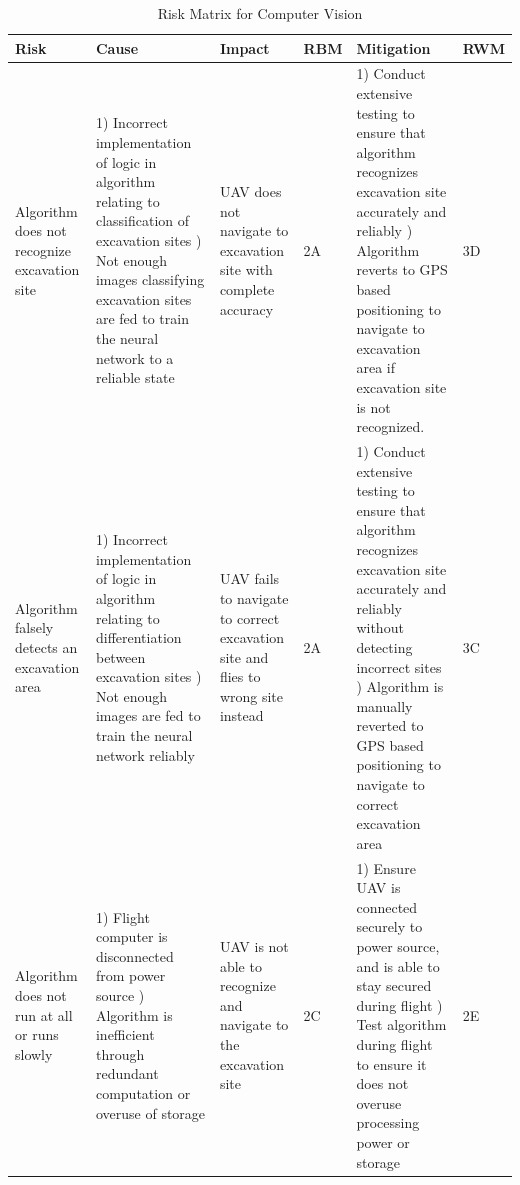  \begin{table}[]
                \label{computer vision}
                {\footnotesize
                \caption{Risk Matrix for Computer Vision}
                \centering
                \begin{tabularx}{\linewidth}{XXXlXl}
                \toprule
                \textbf{Risk}                                            & \textbf{Cause}                                                                                                                 & \textbf{Impact}                                                                                                                           & \textbf{RBM}  & \textbf{Mitigation}                                                                                                                                                                                     & \textbf{RWM} \\
                \midrule
                Algorithm does not recognize excavation site & 1) Incorrect implementation of logic in algorithm relating to classification of excavation sites \newline 2) Not enough images classifying excavation sites are fed to train the neural network to a reliable state & UAV does not navigate to excavation site with complete accuracy & \cellcolor{red!25} 2A & 1) Conduct extensive testing to ensure that algorithm recognizes excavation site accurately and reliably \newline 2) Algorithm reverts to GPS based positioning to navigate to excavation area if excavation site is not recognized. & \cellcolor{green!25} 3D \\
                Algorithm falsely detects an excavation area & 1) Incorrect implementation of logic in algorithm relating to differentiation between excavation sites \newline 2) Not enough images are fed to train the neural network reliably & UAV fails to navigate to correct excavation site and flies to wrong site instead & \cellcolor{red!25} 2A & 1) Conduct extensive testing to ensure that algorithm recognizes excavation site accurately and reliably without detecting incorrect sites \newline 2) Algorithm is manually reverted to GPS based positioning to navigate to correct excavation area & \cellcolor{orange!25} 3C \\
                Algorithm does not run at all or runs slowly & 1) Flight computer is disconnected from power source \newline 2) Algorithm is inefficient through redundant computation or overuse of storage & UAV is not able to recognize and navigate to the excavation site & \cellcolor{orange!25} 2C & 1) Ensure UAV is connected securely to power source, and is able to stay secured during flight \newline 2) Test algorithm during flight to ensure it does not overuse processing power or storage & \cellcolor{green!25} 2E \\

\end{tabularx}}
\end{table}
